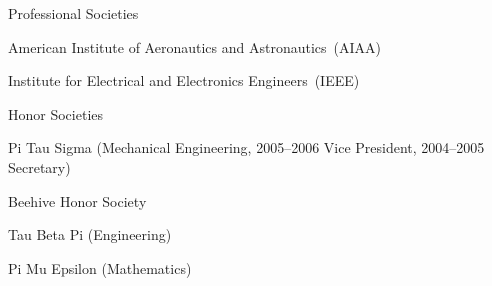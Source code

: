 Professional Societies
\begin{innerlist}
\item American Institute of Aeronautics and Astronautics~(AIAA)
\item Institute for Electrical and Electronics Engineers~(IEEE)
\end{innerlist}
%
\halfblankline

Honor Societies
\begin{innerlist}
\item Pi Tau Sigma (Mechanical Engineering, 2005--2006 Vice President, 2004--2005 Secretary)
\item Beehive Honor Society
\item Tau Beta Pi (Engineering)
\item Pi Mu Epsilon (Mathematics)
\end{innerlist}